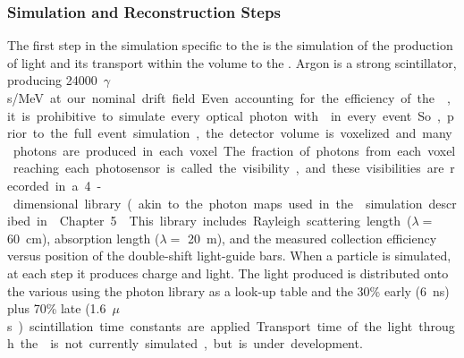 
\subsubsection{Simulation and Reconstruction Steps} 

The first step in the simulation specific to the  is the simulation of the production of light and its transport within the volume to the . Argon is a strong scintillator, producing \SI{24000}{$\gamma$s/MeV} at our nominal drift field. Even accounting for the efficiency of the , it is prohibitive to simulate every optical photon with  in every event. So, prior to the full event simulation, the detector volume is voxelized and many photons are produced in each voxel. The fraction of photons from each voxel reaching each photosensor is called the visibility, and these visibilities are recorded in a 4-dimensional library (akin to the photon maps used in the  simulation described in \voltitledp~Chapter 5.
This library includes Rayleigh scattering length ($\lambda=$ \SI{60}{cm}\cite{Grace:2015yta}), absorption length ($\lambda=$ \SI{20}{m}), and the measured collection efficiency versus position of the double-shift light-guide bars. When a particle is simulated, at each step it produces charge and light. The light produced is distributed onto the various  using the photon library as a look-up table and the 30\% early (\SI{6}{ns}) plus 70\% late (\SI{1.6}{$\mu$s}) scintillation time constants are applied. Transport time of the light through the \lar is not currently simulated, but is under development.

